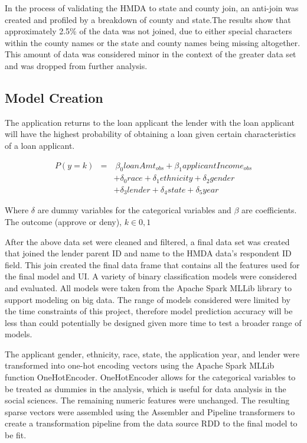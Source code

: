 \documentclass[conference,compsoc]{IEEEtran}
\begin{document}
In the process of validating the HMDA to state and county join, an anti-join was created and profiled by a breakdown of county and state.The results show that approximately 2.5\% of the data was not joined, due to either special characters within the county names or the state and county names being missing altogether. This amount of data was considered minor in the context of the greater data set and was dropped from further analysis.


\subsection{Model Creation}

The application returns to the loan applicant the lender with the loan applicant will have the highest probability of obtaining a loan given certain characteristics of a loan applicant.  

\begin{eqnarray*}
P(y=k) & = & \ \beta_0 loanAmt_{obs}  + \beta_1 applicantIncome_{obs} \\
& & + \delta_0 race + \delta_1 ethnicity  + \delta_2 gender  \\
& & + \delta_3 lender  +  \delta_4 state + \delta_5 year
\end{eqnarray*}

Where $\delta$ are dummy variables for the categorical variables and $\beta$ are coefficients. The outcome (approve or deny), $k \in 0,1$

 \vspace{5mm}

After the above data set were cleaned and filtered, a final data set was created that joined the lender parent ID and name to the HMDA data’s respondent ID field. This join created the final data frame that contains all the features used for the final model and UI.
A variety of binary classification models were considered and evaluated. All models were taken from the Apache Spark MLLib library to support modeling on big data. The range of models considered were limited by the time constraints of this project, therefore model prediction accuracy will be less than could potentially be designed given more time to test a broader range of models. 

The applicant gender, ethnicity, race, state, the application year, and lender were transformed into one-hot encoding vectors using the Apache Spark MLLib function OneHotEncoder.  OneHotEncoder allows for the categorical variables to be treated as dummies in the analysis, which is useful for data analysis in the social sciences.  The remaining numeric features were unchanged. The resulting sparse vectors were assembled using the Assembler and Pipeline transformers to create a transformation pipeline from the data source RDD to the final model to be fit. 
\end{document}
